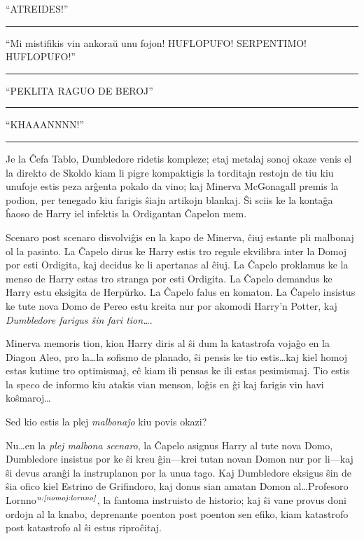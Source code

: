 ``ATREIDES!''

\begin{center}\rule{3in}{0.4pt}\end{center}

``Mi mistifikis vin ankoraŭ unu fojon! HUFLOPUFO! SERPENTIMO!
HUFLOPUFO!''

\begin{center}\rule{3in}{0.4pt}\end{center}

``PEKLITA RAGUO DE BEROJ''

\begin{center}\rule{3in}{0.4pt}\end{center}

``KHAAANNNN!''

\begin{center}\rule{3in}{0.4pt}\end{center}

Je la Ĉefa Tablo, Dumbledore ridetis kompleze; etaj metalaj sonoj
okaze venis el la direkto de Skoldo kiam li pigre kompaktigis la
torditajn restojn de tiu kiu unufoje estis peza arĝenta pokalo da
vino; kaj Minerva McGonagall premis la podion, per tenegado kiu
farigis ŝiajn artikojn blankaj. Ŝi sciis ke la kontaĝa ĥaoso de Harry
iel infektis la Ordigantan Ĉapelon mem.

Scenaro post scenaro disvolviĝis en la kapo de Minerva, ĉiuj estante
pli malbonaj ol la pasinto.  La Ĉapelo dirus ke Harry estis tro regule
ekvilibra inter la Domoj por esti Ordigita, kaj decidus ke li
apertanas al ĉiuj. La Ĉapelo proklamus ke la menso de Harry estas tro
stranga por esti Ordigita. La Ĉapelo demandus ke Harry estu eksigita
de Herpŭrko. La Ĉapelo falus en komaton. La Ĉapelo insistus ke tute
nova Domo de Pereo estu kreita nur por akomodi Harry'n Potter, kaj
\emph{Dumbledore farigus ŝin fari tion\ldots}.

Minerva memoris tion, kion Harry diris al ŝi dum la katastrofa vojaĝo
en la Diagon Aleo, pro la\ldots la sofismo de planado, ŝi pensis ke
tio estis\ldots kaj kiel homoj estas kutime tro optimismaj, eĉ kiam
ili pensas ke ili estas pesimismaj. Tio estis la speco de informo kiu
atakis vian menson, loĝis en ĝi kaj farigis vin havi koŝmaroj\ldots

Sed kio estis la plej \emph{malbonaĵo} kiu povis okazi?

Nu\ldots en la \emph{plej malbona scenaro}, la Ĉapelo asignus Harry al
tute nova Domo, Dumbledore insistus por ke ŝi kreu ĝin—krei tutan
novan Domon nur por li—kaj ŝi devus aranĝi la instruplanon por la unua
tago. Kaj Dumbledore eksigus ŝin de ŝia ofico kiel Estrino de
Grifindoro, kaj donus sian amatan Domon al\ldots Profesoro
Lornno$^{\textit{n:\ref{nomoj:lornno}}}$, la fantoma instruisto de historio; kaj
ŝi vane provus doni ordojn al la knabo, deprenante poenton post
poenton sen efiko, kiam katastrofo post katastrofo al ŝi estus
riproĉitaj.

